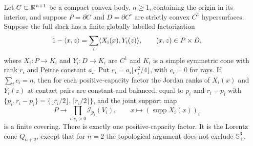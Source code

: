 \begin{theorem}\label{thm:global-saturation}
Let $C\subset\mathbb R^{n+1}$ be a compact convex body, $n\geq1$, containing the origin in its interior,
and suppose $P=\partial C$ and $D=\partial C^\circ$ are strictly convex
$C^1$ hypersurfaces. Suppose the full slack has a finite globally labelled
factorization
\[
 1-\langle x,z\rangle=\sum_i\langle X_i(x),Y_i(z)\rangle,\qquad (x,z)\in P\times D,
\]
where $X_i:P\to K_i$ and $Y_i:D\to K_i$ are $C^1$ and $K_i$ is a simple
symmetric cone with rank $r_i$ and Peirce constant $a_i$. Put
$c_i=a_i\lfloor r_i^2/4\rfloor$, with $c_i=0$ for rays.
If $\sum_i c_i=n$, then for each positive-capacity factor the Jordan
ranks of $X_i(x)$ and $Y_i(z)$ at contact pairs are constant and
balanced, equal to $p_i$ and $r_i-p_i$ with
$\{p_i,r_i-p_i\}=\{\lfloor r_i/2\rfloor,\lceil r_i/2\rceil\}$, and the
joint support map
\[
 P\longrightarrow\prod_{i:c_i>0}\mathcal I_{p_i}(V_i),
 \qquad x\longmapsto(\operatorname{supp}X_i(x))_i
\]
is a finite covering. There is exactly one positive-capacity factor.
It is the Lorentz cone $Q_{n+2}$, except that for $n=2$ the
topological argument does not exclude $\mathbb S_+^3$.
\end{theorem}
